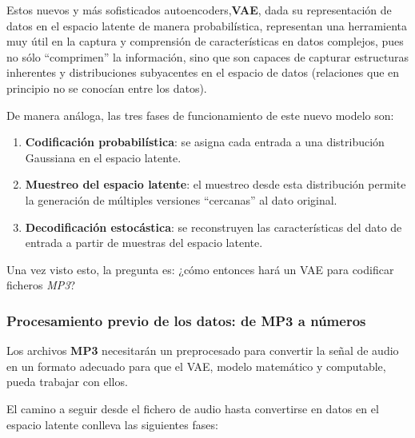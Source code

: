 Estos nuevos y más sofisticados  autoencoders,\textbf{VAE}, dada su representación de datos en el espacio latente de manera probabilística, representan una herramienta muy útil en la captura y comprensión de características en datos complejos, pues no sólo ``comprimen'' la información, sino que son capaces de capturar estructuras inherentes y distribuciones subyacentes en el espacio de datos (relaciones que en principio no se conocían entre los datos).

De manera análoga, las tres fases de funcionamiento de este nuevo modelo son:

\begin{enumerate}
    \item \textbf{Codificación probabilística}: se asigna cada entrada a una distribución Gaussiana en el espacio latente.
    \item \textbf{Muestreo del espacio latente}: el muestreo desde esta distribución permite la generación de múltiples versiones ``cercanas'' al dato original.
    \item \textbf{Decodificación estocástica}: se reconstruyen las características del dato de entrada a partir de muestras del espacio latente.
\end{enumerate}

Una vez visto esto, la pregunta es: ¿cómo entonces hará un VAE para codificar ficheros \emph{MP3}?

\subsubsection{Procesamiento previo de los datos: de MP3 a números}
\label{proc_mp3}
Los archivos \textbf{MP3} necesitarán un preprocesado para convertir la señal de audio en un formato adecuado para que el VAE, modelo matemático y computable, pueda trabajar con ellos.

El camino a seguir desde el fichero de audio hasta convertirse en datos en el espacio latente conlleva las siguientes fases:

